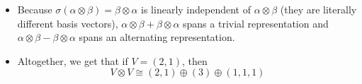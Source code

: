 \documentclass[../notes.tex]{subfiles}
\begin{document}
\begin{itemize}
\begin{itemize}
        \item Because $\sigma(\alpha\otimes\beta)=\beta\otimes\alpha$ is linearly independent of $\alpha\otimes\beta$ (they are literally different basis vectors), $\alpha\otimes\beta+\beta\otimes\alpha$ spans a trivial representation and $\alpha\otimes\beta-\beta\otimes\alpha$ spans an alternating representation.
        \item Altogether, we get that if $V=(2,1)$, then
        \begin{equation*}
            V\otimes V \cong (2,1)\oplus(3)\oplus(1,1,1)
        \end{equation*}
    \end{itemize}
\end{itemize}
\end{document}
